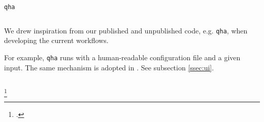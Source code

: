 \begin{frame}{\texttt{qha}}
    \begin{columns}[t]
        \begin{column}{0.4\textwidth}
            We drew inspiration from our published and unpublished code, e.g. \texttt{qha},
            when developing the current workflows.

            For example, \texttt{qha} runs with a human-readable
            configuration file and a given input.
            The same mechanism is adopted in \express{}.
            See subsection \ref{ssec:ui}.
        \end{column}

        \begin{column}{0.6\textwidth}
        \end{column}
    \end{columns}
    \footcitetext{QIN2019199}

\end{frame}

